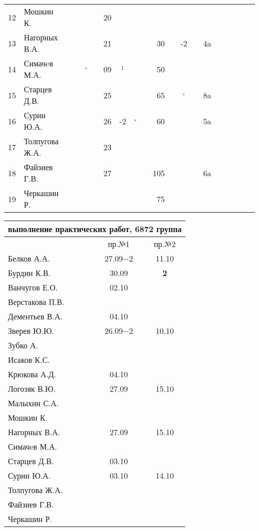 \documentclass[a4paper,11pt]{article}
\newcommand*\OK{&\small \ding{51}$\!\!_\circ$} %
\newcommand*\Ok{&\small \ding{51}$\!\!_\circ$} %
\newcommand*\ok{&{\small\ding{51}}} %
\newcommand*\no{&{\small }} %
\newcommand*\da{&{\small\ding{48}$\!\!_1$}} %
\begin{document}
\begin{tabular}{l|l|ccccccccrccccccccc}
12& Мошкин К.        \ok\ok\ok\ok&20\ok\no\no \no\no\no\ok \no&&&&\\
13& Нагорных В.А.    \ok\ok\ok\ok&21\ok\ok\ok& 30\ok&-2\ok& 4a&&&&\\
14& Симачeв М.А.     \ok\ok\OK\ok&09\da\no\no& 50\no\no\no \no&&&&\\
15& Старцев Д.В.     \ok\ok\ok\ok&25\ok\ok\ok& 65\ok\Ok\ok& 8a&&&&\\
16& Сурин Ю.А.       \ok\ok\ok\ok&26&-2\OK\ok& 60\ok\ok\ok& 5a&&&&\\
17& Толпугова Ж.А.   \no\no\no\no&23\ok\no\no \no\no\no\no\no&&&&\\
18& Файзиев Г.В.     \ok\ok\ok\ok&27\ok\ok\ok&105\ok\ok\ok& 6a&&&&\\
19& Черкашин Р.      \ok\ok\ok\ok\no\no\no\no& 75\no\ok\ok \no&&&&\\ 
\bottomrule
\end{tabular} 

\newpage
\begin{tabular}{l|cc}
\multicolumn{3}{c}{выполнение практических работ, 6872 группа} \\
\toprule
& пр.№1 & пр.№2 \\
\midrule
Белков А.А.    &27.09$-2$&11.10\\   
Бурдин К.В.    &30.09    &{\bf 2}\\
Ванчугов Е.О.  &02.10    &     \\
Верстакова П.В.&         &     \\
Дементьев В.А. &04.10    &     \\
Зверев Ю.Ю.    &26.09$-2$&10.10\\
Зубко А.       &         &     \\
Исаков К.С.    &         &     \\
Крюкова А.Д.   &04.10    &     \\
Логозяк В.Ю.   &27.09    &15.10\\
Малыхин С.А.   &         &     \\
Мошкин К.      &         &     \\
Нагорных В.А.  &27.09    &15.10\\
Симачeв М.А.   &         &     \\
Старцев Д.В.   &03.10    &     \\
Сурин Ю.А.     &03.10    &14.10\\
Толпугова Ж.А. &         &     \\
Файзиев Г.В.   &         &     \\
Черкашин Р.    &         &     \\
\bottomrule
\end{tabular}
\end{document}
